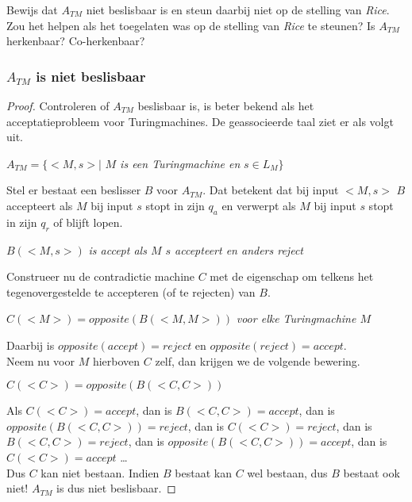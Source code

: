 \begin{question}
	Bewijs dat $A_{TM}$ niet beslisbaar is en steun daarbij niet op de stelling van \textit{Rice}. Zou het helpen als het toegelaten was op de stelling van \textit{Rice} te steunen? Is $A_{TM}$ herkenbaar? Co-herkenbaar?
\end{question}


\subsubsection*{$A_{TM}$ is niet beslisbaar}
\begin{proof}
	Controleren of $A_{TM}$ beslisbaar is, is beter bekend als het acceptatieprobleem voor Turingmachines. De geassocieerde taal ziet er als volgt uit.
	
	\begin{pushcenter}
		$A_{TM} = \{ <M,s> |$ \textit{$M$ is een Turingmachine en} $ s \in L_M\}$
	\end{pushcenter}
	
	Stel er bestaat een beslisser $B$ voor $A_{TM}$. Dat betekent dat bij input $<M,s>$ $B$ accepteert als $M$ bij input $s$ stopt in zijn $q_a$ en verwerpt als $M$ bij input $s$ stopt in zijn $q_r$ of blijft lopen.
	
	\begin{pushcenter}
		$B(<M,s>)$ \textit{is accept als $M$ $s$ accepteert en anders reject}
	\end{pushcenter}
	
	Construeer nu de contradictie machine $C$ met de eigenschap om telkens het tegenovergestelde te accepteren (of te rejecten) van $B$.
	
	\begin{pushcenter}
		$C(<M>) = opposite(B(<M,M>))$ \textit{voor elke Turingmachine $M$}
	\end{pushcenter}
	
	Daarbij is $opposite(accept) = reject$ en $opposite(reject) = accept$. \\
	Neem nu voor $M$ hierboven $C$ zelf, dan krijgen we de volgende bewering.
	
	\begin{pushcenter}
		$C(<C>) = opposite(B(<C,C>))$
	\end{pushcenter}		
	
	Als $C(<C>) = accept$, dan is $B(<C,C>) = accept$, dan is $opposite(B(<C,C>)) = reject$, dan is $C(<C>) = reject$, dan is $B(<C,C>) = reject$, dan is $opposite(B(<C,C>)) = accept$, dan is $C(<C>) = accept$ \dots \\
	Dus $C$ kan niet bestaan. Indien $B$ bestaat kan $C$ wel bestaan, dus $B$ bestaat ook niet! $A_{TM}$ is dus niet beslisbaar.
\end{proof} 

